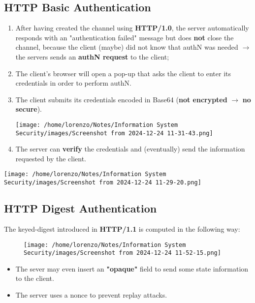 \subsection{HTTP Basic Authentication}
\begin{minipage}{0.5\textwidth}
    \begin{enumerate}
        \item After having created the channel using \textbf{HTTP/1.0}, the server automatically responds
        with an "authentication failed" message but does \textbf{not} close the channel, because the client (maybe) did not know that authN was needed \(\rightarrow\) the servers sends an \textbf{authN request} to the client;
        \item The client's browser will open a pop-up that asks the client to enter its credentials in order to perform authN.
        \item The client submits its credentials encoded in Base64 (\textbf{not encrypted} \(\rightarrow\) \textbf{no secure}).
        
            \texttt{[image: /home/lorenzo/Notes/Information System Security/images/Screenshot from 2024-12-24 11-31-43.png]}

        \item The server can \textbf{verify} the credentials and (eventually) send the information requested by the client. 
    \end{enumerate}
\end{minipage} 
\hspace{0.2cm}
\begin{minipage}{0.5\textwidth}
    \centering
    \texttt{[image: /home/lorenzo/Notes/Information System Security/images/Screenshot from 2024-12-24 11-29-20.png]}
\end{minipage}

\subsection{HTTP Digest Authentication}
The keyed-digest introduced in \textbf{HTTP/1.1} is computed in the following way:
\begin{figure}[h]
    \centering
    \texttt{[image: /home/lorenzo/Notes/Information System Security/images/Screenshot from 2024-12-24 11-52-15.png]}
\end{figure}
\noindent
\begin{itemize}
    \item The sever may even insert an \textbf{"opaque"} field to send some state information to the client.
    \item The server uses a nonce to prevent replay attacks.
\end{itemize}


